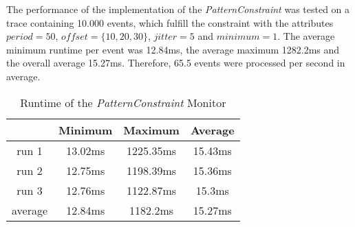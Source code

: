 	The performance of the implementation of the \emph{PatternConstraint} was tested on a trace containing 10.000 events, which fulfill the constraint with the attributes $period=50$, $offset=\{10, 20, 30\}$, $jitter=5$ and $minimum = 1$. The average minimum runtime per event was 12.84ms, the average maximum 1282.2ms and the overall average 15.27ms. Therefore, 65.5 events were processed per second in average. 
	\begin{table}
		\begin{tabular}{|c|c|c|c|}
			\hline
					& Minimum & Maximum & Average \\
			\hline
			run 1	& 13.02ms & 1225.35ms & 15.43ms \\
			\hline
			run 2	& 12.75ms & 1198.39ms & 15.36ms\\
			\hline
			run 3	& 12.76ms & 1122.87ms & 15.3ms\\
			\hline
			average & 12.84ms & 1182.2ms  & 15.27ms\\
			\hline
		\end{tabular}
		\centering
		\label{tab:runtimePatternConstraint}
		\caption{Runtime of the \emph{PatternConstraint} Monitor}
	\end{table}
	
